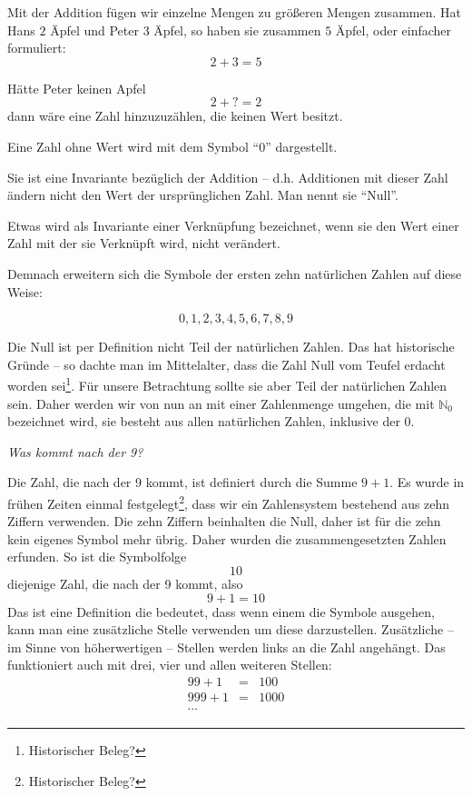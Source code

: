 Mit der Addition fügen wir einzelne Mengen zu größeren Mengen zusammen. Hat Hans $2$ Äpfel und Peter $3$ Äpfel, so haben sie zusammen $5$ Äpfel, oder einfacher formuliert:
\[
2+3=5
\]

\noindent Hätte Peter keinen Apfel
\[2+?=2\]
dann wäre eine Zahl hinzuzuzählen, die keinen Wert besitzt. 
\begin{definition}
Eine Zahl ohne Wert wird mit dem Symbol "`0"' dargestellt.
\end{definition}

Sie ist eine Invariante bezüglich der Addition -- d.h. Additionen mit dieser Zahl ändern nicht den Wert der ursprünglichen Zahl. Man nennt sie "`Null"'. 

\begin{definition}
Etwas wird als Invariante einer Verknüpfung bezeichnet, wenn sie den Wert einer Zahl mit der sie Verknüpft wird, nicht verändert.
\end{definition}

Demnach erweitern sich die Symbole der ersten zehn natürlichen Zahlen auf diese Weise:

\[0,1,2,3,4,5,6,7,8,9\]

Die Null ist per Definition nicht Teil der natürlichen Zahlen. Das hat historische Gründe -- so dachte man im Mittelalter, dass die Zahl Null vom Teufel erdacht worden sei\footnote{Historischer Beleg?}. Für unsere Betrachtung sollte sie aber Teil der natürlichen Zahlen sein. Daher werden wir von nun an mit einer Zahlenmenge umgehen, die mit $\mathbb{N}_0$ bezeichnet wird, sie besteht aus allen natürlichen Zahlen, inklusive der 0.

\textsl{Was kommt nach der 9?}

Die Zahl, die nach der 9 kommt, ist definiert durch die Summe $9+1$. Es wurde in frühen Zeiten einmal festgelegt\footnote{Historischer Beleg?}, dass wir ein Zahlensystem bestehend aus zehn Ziffern verwenden. Die zehn Ziffern beinhalten die Null, daher ist für die zehn kein eigenes Symbol mehr übrig. Daher wurden die zusammengesetzten Zahlen erfunden. So ist die Symbolfolge
\[10\]
diejenige Zahl, die nach der 9 kommt, also
\[9+1=10\]
Das ist eine Definition die bedeutet, dass wenn einem die Symbole ausgehen, kann man eine zusätzliche Stelle verwenden um diese darzustellen. Zusätzliche -- im Sinne von höherwertigen -- Stellen werden links an die Zahl angehängt. Das funktioniert auch mit drei, vier und allen weiteren Stellen:
\begin{eqnarray*}
99+1 &=& 100 \\
999+1 &=& 1000 \\
\cdots
\end{eqnarray*}

